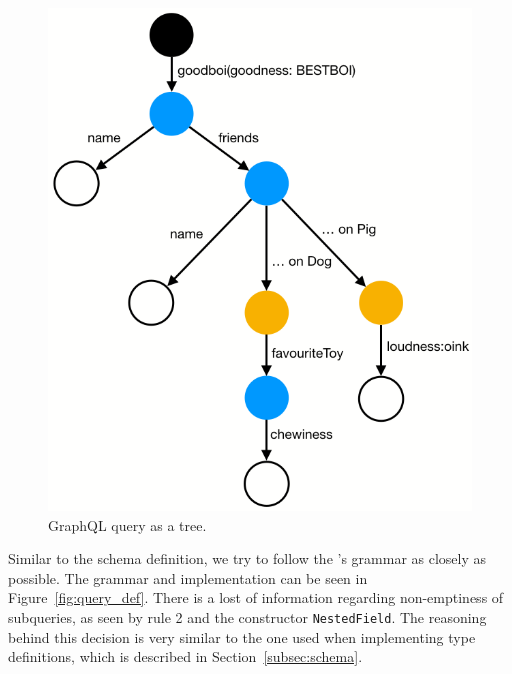 \begin{figure}
    \centering
    \includegraphics[scale=0.33]{imgs/query_tree.png}
    \caption{GraphQL query as a tree.}
    \label{fig:query_tree}
\end{figure}

Similar to the schema definition, we try to follow the \spec{}'s grammar as closely as possible. The grammar and implementation can be seen in Figure~\ref{fig:query_def}. There is a lost of information regarding non-emptiness of subqueries, as seen by rule 2 and the constructor \texttt{NestedField}. The reasoning behind this decision is very similar to the one used when implementing type definitions, which is described in Section~\ref{subsec:schema}.


